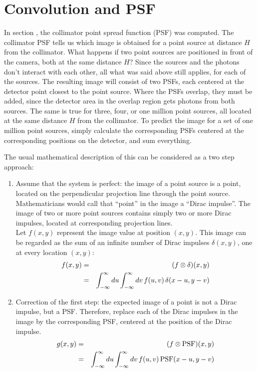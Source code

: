 \newpage
\section{Convolution and PSF\label{app:convolution}}
In section , the collimator point spread function (PSF)
was computed. The collimator PSF tells us which image is obtained for a point
source at distance $H$ from the collimator. What happens if two point sources
are positioned in front of the camera, both at the same distance $H$? Since
the sources and the photons don't interact with each other, all what was said
above still applies, for each of the sources. The resulting image will consist
of two PSFs, each centered at the detector point closest to the point
source. Where the PSFs overlap, they must be added, since the detector area
in the overlap region gets photons from both sources. The same is true for
three, four, or one million point sources, all located at the same distance
$H$ from the collimator. To predict the image for a set of one million point
sources, simply calculate the corresponding PSFs centered at the
corresponding positions on the detector, and sum everything.

The usual mathematical description of this can be considered as a two step
approach:
\begin{enumerate}
\item
Assume that the system is perfect: the image of a point source is a point,
located on the perpendicular projection line through the point source.
Mathematicians would call that ``point'' in the image a ``Dirac impulse''.
The image of two or more point sources contains simply two or more Dirac
impulses, located at corresponding projection lines.\\
%
Let $f(x,y)$ represent the image value at position $(x,y)$. This image
can be regarded as the sum of an infinite number of Dirac impulses
$\delta(x,y)$, one at every location $(x,y)$:
\begin{eqnarray}
f(x,y) & = & (f \otimes \delta) (x,y)\\
       & = & \int_{-\infty}^{\infty} du \int_{-\infty}^{\infty} dv \, f(u,v) \, \delta(x-u, y-v)
\end{eqnarray}

\item
Correction of the first step: the expected image of a point is not a Dirac
impulse, but a PSF. Therefore, replace each of the Dirac impulses in the image
by the corresponding PSF, centered at the position of the Dirac impulse.
\begin{eqnarray}
g(x,y) & = & (f \otimes \mbox{PSF}) (x,y)\\
       & = & \int_{-\infty}^{\infty} du \int_{-\infty}^{\infty} dv \, f(u,v) \, \mbox{PSF}(x-u, y-v)
\end{eqnarray}
\end{enumerate}

